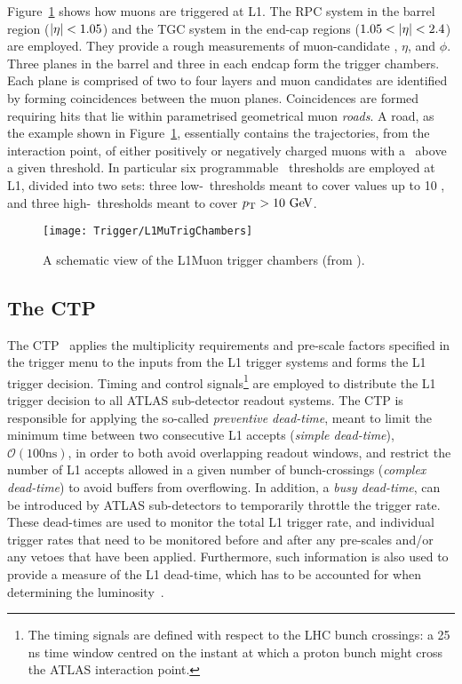 			Figure~\ref{fig:L1MuTrig} shows how muons are triggered at \ac{L1}. The \ac{RPC} system in the barrel region ($|\eta| < 1.05$) and the \ac{TGC} system in the end-cap regions ($1.05 < |\eta| < 2.4$) are employed. They provide a rough measurements of muon-candidate \pt, $\eta$, and $\phi$. Three planes in the barrel and three in each endcap form the trigger chambers. Each plane is comprised of two to four layers and muon candidates are identified by forming coincidences between the muon planes. Coincidences are formed requiring hits that lie within parametrised geometrical muon \emph{roads}. A road, as the example shown in Figure~\ref{fig:L1MuTrig}, essentially contains the trajectories, from the interaction point, of either positively or negatively charged muons with a \pt\ above a given threshold. In particular six programmable \pt\ thresholds are employed at \ac{L1}, divided into two sets: three low-\pt\ thresholds meant to cover values up to 10 \GeV, and three high-\pt\ thresholds meant to cover $\pt > 10 \GeV$.

			\begin{figure}[!htb]
				\centering
				\texttt{[image: Trigger/L1MuTrigChambers]}
				\caption{\label{fig:L1MuTrig} A schematic view of the \ac{L1Muon} trigger chambers (from \cite{ATLASTrigger2010}).}
			\end{figure}


		\subsection*{The CTP}

			The \ac{CTP}~\cite{ATLASJINST} applies the multiplicity requirements and pre-scale factors specified in the trigger menu to the inputs from the \ac{L1} trigger systems and forms the \ac{L1} trigger decision. Timing and control signals\footnote{The timing signals are defined with respect to the \ac{LHC} bunch crossings: a 25 ns time window centred on the instant at which a proton bunch might cross the \ac{ATLAS} interaction point.} are employed to distribute the \ac{L1} trigger decision to all \ac{ATLAS} sub-detector readout systems. The \ac{CTP} is responsible for applying the so-called \emph{preventive dead-time}, meant to limit the minimum time between two consecutive \ac{L1} accepts (\emph{simple dead-time}), $\mathcal{O}(100 \mathrm{ns})$, in order to both avoid overlapping readout windows, and restrict the number of \ac{L1} accepts allowed in a given number of bunch-crossings (\emph{complex dead-time}) to avoid buffers from overflowing. In addition, a \emph{busy dead-time}, can be introduced by \ac{ATLAS} sub-detectors to temporarily throttle the trigger rate. These dead-times are used to monitor the total \ac{L1} trigger rate, and individual trigger rates that need to be monitored before and after any pre-scales and/or any vetoes that have been applied. Furthermore, such information is also used to provide a measure of the \ac{L1} dead-time, which has to be accounted for when determining the luminosity~\cite{ATLASTrigger2010}.


